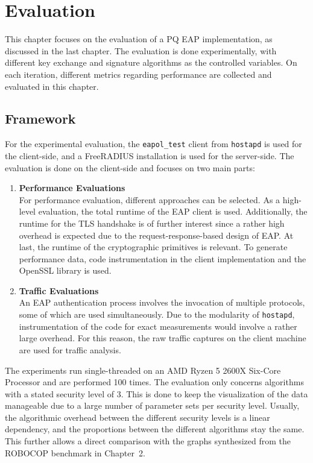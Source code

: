 \chapter{Evaluation}

This chapter focuses on the evaluation of a \ac{PQ} EAP implementation, as discussed in the last chapter. The evaluation is done experimentally, with different key exchange and signature algorithms as the controlled variables. On each iteration, different metrics regarding performance are collected and evaluated in this chapter. 

\section{Framework}
For the experimental evaluation, the \texttt{eapol\_test} client from \texttt{hostapd} is used for the client-side, and a FreeRADIUS installation is used for the server-side. The evaluation is done on the client-side and focuses on two main parts:

\begin{enumerate}
    \item \textbf{Performance Evaluations}\\
    For performance evaluation, different approaches can be selected. As a high-level evaluation, the total runtime of the \ac{EAP} client is used. Additionally, the runtime for the TLS handshake is of further interest since a rather high overhead is expected due to the request-response-based design of EAP. At last, the runtime of the cryptographic primitives is relevant. To generate performance data, code instrumentation in the client implementation and the OpenSSL library is used.
    \item \textbf{Traffic Evaluations}\\
    An \ac{EAP} authentication process involves the invocation of multiple protocols, some of which are used simultaneously. Due to the modularity of \texttt{hostapd}, instrumentation of the code for exact measurements would involve a rather large overhead. For this reason, the raw traffic captures on the client machine are used for traffic analysis.

\end{enumerate}

The experiments run single-threaded on an AMD Ryzen 5 2600X Six-Core Processor and are performed 100 times. The evaluation only concerns algorithms with a stated security level of 3. This is done to keep the visualization of the data manageable due to a large number of parameter sets per security level. Usually, the algorithmic overhead between the different security levels is a linear dependency, and the proportions between the different algorithms stay the same. This further allows a direct comparison with the graphs synthesized from the ROBOCOP benchmark in Chapter~2.

